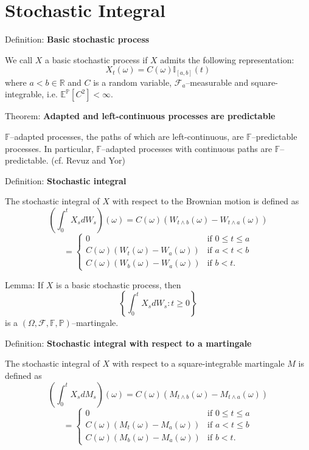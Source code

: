 \documentclass[12pt,a4paper]{article}
\begin{document}
\section{Stochastic Integral}

Definition: \textbf{Basic stochastic process}
\vspace{0.5em}

We call $X$ a basic stochastic process if $X$ admits the following representation:
\[
X_t(\omega) = C(\omega) \mathbb{I}_{[a,b]}(t)
\]
where $a < b \in \mathbb{R}$ and $C$ is a random variable, $\mathcal{F}_a$--measurable and square-integrable, i.e. $\mathbb{E}^{\mathbb{P}}[C^2] < \infty$.
\vspace{1em}

Theorem: \textbf{Adapted and left-continuous processes are predictable}
\vspace{0.5em}

$\mathbb{F}$--adapted processes, the paths of which are left-continuous, are $\mathbb{F}$--predictable processes. In particular, $\mathbb{F}$--adapted processes with continuous paths are $\mathbb{F}$--predictable. (cf. Revuz and Yor)
\vspace{1em}

Definition: \textbf{Stochastic integral}
\vspace{0.5em}

The stochastic integral of $X$ with respect to the Brownian motion is defined as
\[
\left(\int_0^t X_s dW_s\right)(\omega) = C(\omega)(W_{t \wedge b}(\omega) - W_{t \wedge a}(\omega))
\]
\[
= \begin{cases}
0 & \text{if } 0 \leq t \leq a \\
C(\omega)(W_t(\omega) - W_a(\omega)) & \text{if } a < t < b \\
C(\omega)(W_b(\omega) - W_a(\omega)) & \text{if } b < t.
\end{cases}
\]
\vspace{1em}

Lemma: If $X$ is a basic stochastic process, then
\[
\left\{\int_0^t X_s dW_s : t \geq 0\right\}
\]
is a $(\Omega, \mathcal{F}, \mathbb{F}, \mathbb{P})$--martingale.
\vspace{1em}

Definition: \textbf{Stochastic integral with respect to a martingale}
\vspace{0.5em}

The stochastic integral of $X$ with respect to a square-integrable martingale $M$ is defined as
\[
\left(\int_0^t X_s dM_s\right)(\omega) = C(\omega)(M_{t \wedge b}(\omega) - M_{t \wedge a}(\omega))
\]
\[
= \begin{cases}
0 & \text{if } 0 \leq t \leq a \\
C(\omega)(M_t(\omega) - M_a(\omega)) & \text{if } a < t \leq b \\
C(\omega)(M_b(\omega) - M_a(\omega)) & \text{if } b < t.
\end{cases}
\]
\vspace{1em}
\end{document}
